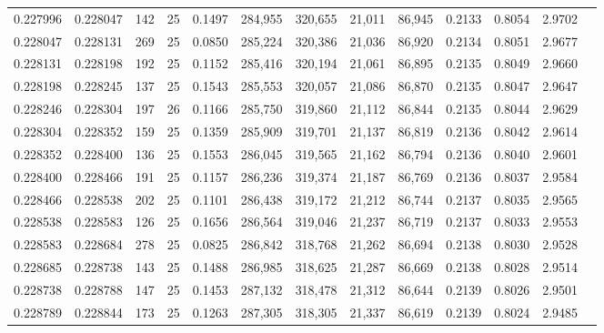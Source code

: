 \begin{tabular}{rrrrrrrrrrrrr}
0.227996 & 0.228047 &   142 &  25 &                                     0.1497 & 284,955 & 320,655 &  21,011 &  86,945 & 0.2133 & 0.8054 & 2.9702 \\
0.228047 & 0.228131 &   269 &  25 &                                     0.0850 & 285,224 & 320,386 &  21,036 &  86,920 & 0.2134 & 0.8051 & 2.9677 \\
0.228131 & 0.228198 &   192 &  25 &                                     0.1152 & 285,416 & 320,194 &  21,061 &  86,895 & 0.2135 & 0.8049 & 2.9660 \\
0.228198 & 0.228245 &   137 &  25 &                                     0.1543 & 285,553 & 320,057 &  21,086 &  86,870 & 0.2135 & 0.8047 & 2.9647 \\
0.228246 & 0.228304 &   197 &  26 &                                     0.1166 & 285,750 & 319,860 &  21,112 &  86,844 & 0.2135 & 0.8044 & 2.9629 \\
0.228304 & 0.228352 &   159 &  25 &                                     0.1359 & 285,909 & 319,701 &  21,137 &  86,819 & 0.2136 & 0.8042 & 2.9614 \\
0.228352 & 0.228400 &   136 &  25 &                                     0.1553 & 286,045 & 319,565 &  21,162 &  86,794 & 0.2136 & 0.8040 & 2.9601 \\
0.228400 & 0.228466 &   191 &  25 &                                     0.1157 & 286,236 & 319,374 &  21,187 &  86,769 & 0.2136 & 0.8037 & 2.9584 \\
0.228466 & 0.228538 &   202 &  25 &                                     0.1101 & 286,438 & 319,172 &  21,212 &  86,744 & 0.2137 & 0.8035 & 2.9565 \\
0.228538 & 0.228583 &   126 &  25 &                                     0.1656 & 286,564 & 319,046 &  21,237 &  86,719 & 0.2137 & 0.8033 & 2.9553 \\
0.228583 & 0.228684 &   278 &  25 &                                     0.0825 & 286,842 & 318,768 &  21,262 &  86,694 & 0.2138 & 0.8030 & 2.9528 \\
0.228685 & 0.228738 &   143 &  25 &                                     0.1488 & 286,985 & 318,625 &  21,287 &  86,669 & 0.2138 & 0.8028 & 2.9514 \\
0.228738 & 0.228788 &   147 &  25 &                                     0.1453 & 287,132 & 318,478 &  21,312 &  86,644 & 0.2139 & 0.8026 & 2.9501 \\
0.228789 & 0.228844 &   173 &  25 &                                     0.1263 & 287,305 & 318,305 &  21,337 &  86,619 & 0.2139 & 0.8024 & 2.9485 \\

\end{tabular}
